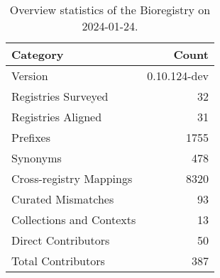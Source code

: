 \begin{table}
\caption{Overview statistics of the Bioregistry on 2024-01-24.}
\label{tab:bioregistry-summary}
\begin{tabular}{lr}
\toprule
Category & Count \\
\midrule
Version & 0.10.124-dev \\
Registries Surveyed & 32 \\
Registries Aligned & 31 \\
Prefixes & 1755 \\
Synonyms & 478 \\
Cross-registry Mappings & 8320 \\
Curated Mismatches & 93 \\
Collections and Contexts & 13 \\
Direct Contributors & 50 \\
Total Contributors & 387 \\
\bottomrule
\end{tabular}
\end{table}
